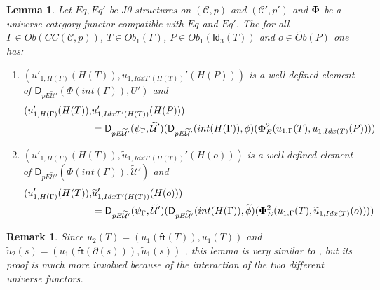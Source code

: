 \documentclass[12pt]{article}
\numberwithin{equation}{section}
\newtheorem{lemma}[proposition]{Lemma}
\newtheorem{remark}[proposition]{Remark}
\newcommand{\wt}{\widetilde}
\newcommand{\toCC}{CC} %
\newcommand{\C}{{\mathcal C}}  %
\newcommand{\ft}{\mathsf{ft}}
\newcommand{\Idx}{\mathsf{Id_3}} %
\newcommand{\U}{\mathcal{U}}
\newcommand{\D}{\mathsf{D}}
\newcommand{\Obwt}{\wt{Ob}}
\begin{document}
\begin{lemma}
\label{2015.05.06.l3} Let $Eq, Eq'$ be J0-structures on $({\C},p)$ and
$({\C}',p')$ and $\bf\Phi$ be a universe category functor compatible
with $Eq$ and $Eq'$. The for all $\Gamma\in Ob(\toCC({\C},p))$, $T\in
Ob_1(\Gamma)$, $P\in Ob_1(\Idx(T))$ and $o\in \Obwt(P)$ one has:
%
\begin{enumerate}
\item $(u'_{1,H(\Gamma)}(H(T)), u_{1,IdxT'(H(T))}'(H(P)))$ is a well defined
  element of $\D_{pE\wt{\U}'}(\Phi(int(\Gamma)),U')$ and
%
  \begin{align*}
    (u'_{1,H(\Gamma)}(H(T)), & u_{1,IdxT'(H(T))}'(H(P))) \\
    & = \D_{pE\wt{\U}'}(\psi_{\Gamma},\wt{\U}')(\D_{pE\wt{\U}'}(int(H(\Gamma)),\phi)({\bf\Phi}_{E}^2(u_{1,\Gamma}(T),u_{1,Idx(T)}(P))))
  \end{align*}
\item $(u'_{1,H(\Gamma)}(H(T)), \wt{u}_{1,IdxT'(H(T))}'(H(o)))$ is a well
  defined element of $\D_{pE\wt{\U}'}(\Phi(int(\Gamma)),\wt{\U}')$ and
%
  \begin{align*}
    (u'_{1,H(\Gamma)}(H(T)), & \wt{u}_{1,IdxT'(H(T))}'(H(o))) \\
    & = \D_{pE\wt{\U}'}(\psi_{\Gamma},\wt{\U}')(\D_{pE\wt{\U}'}(int(H(\Gamma)),\wt{\phi})({\bf\Phi}_{E}^2(u_{1,\Gamma}(T),\wt{u}_{1,Idx(T)}(o))))
  \end{align*}
\end{enumerate}
\end{lemma}
%
\begin{remark}\rm
Since $u_2(T)=(u_1(\ft(T)),u_1(T))$ and
$\wt{u}_2(s)=(u_1(\ft(\partial(s))),\wt{u}_1(s))$ , this lemma is very similar
to \cite[Lemma 6.1(3,4)]{fromunivwithPi}, but its proof is much more involved
because of the interaction of the two different universe functors.
\end{remark}
%
\end{document}
